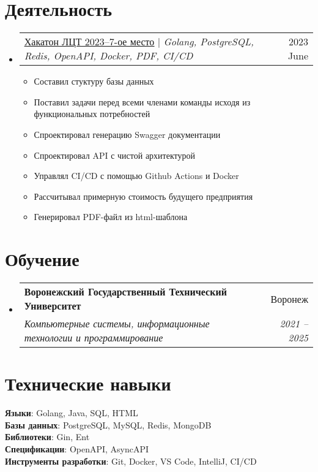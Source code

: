 \documentclass[letterpaper,11pt]{article}
\makeatletter
\newcommand{\resumeItem}[1]{
  \item\small{
    {#1 \vspace{-2pt}}
  }
}
\newcommand{\resumeSubheading}[4]{
  \vspace{-2pt}\item
    \begin{tabular*}{0.97\textwidth}[t]{l@{\extracolsep{\fill}}r}
      \textbf{#1} & #2 \\
      \textit{\small#3} & \textit{\small #4} \\
    \end{tabular*}\vspace{-7pt}
}
\newcommand{\resumeProjectHeading}[2]{
    \item
    \begin{tabular*}{0.97\textwidth}{l@{\extracolsep{\fill}}r}
      \small#1 & #2 \\
    \end{tabular*}\vspace{-7pt}
}
\newcommand{\resumeSubHeadingListStart}{\begin{itemize}[leftmargin=0.15in, label={}]}
\newcommand{\resumeSubHeadingListEnd}{\end{itemize}}
\newcommand{\resumeItemListStart}{\begin{itemize}}
\newcommand{\resumeItemListEnd}{\end{itemize}\vspace{-5pt}}
\makeatother
\begin{document}
\section{Деятельность}
\resumeSubHeadingListStart
\resumeProjectHeading
{\href{https://github.com/wtkeqrf0/CV/blob/main/Leaders_Digital_Transformations_2023.pdf}{\underline{Хакатон ЛЦТ 2023--7-ое место}} $|$ \emph{Golang, PostgreSQL, Redis, OpenAPI, Docker, PDF, CI/CD}}{2023 June}
\resumeItemListStart
\resumeItem{Составил стуктуру базы данных}
\resumeItem{Поставил задачи перед всеми членами команды исходя из функциональных потребностей}
\resumeItem{Спроектировал генерацию Swagger документации}
\resumeItem{Спроектировал API с чистой архитектурой}
\resumeItem{Управлял CI/CD с помощью Github Actions и Docker}
\resumeItem{Рассчитывал примерную стоимость будущего предприятия}
\resumeItem{Генерировал PDF-файл из html-шаблона}
\resumeItemListEnd
\resumeSubHeadingListEnd

\section{Обучение}
\resumeSubHeadingListStart
\resumeSubheading
{Воронежский Государственный Технический Университет}{Воронеж}
{Компьютерные системы, информационные технологии и программирование}{2021 -- 2025}
\resumeSubHeadingListEnd

\section{Технические навыки}
\begin{itemize}[leftmargin=0.15in, label={}]
	\small{\item{
		\textbf{Языки}{: Golang, Java, SQL, HTML} \\
		\textbf{Базы данных}{: PostgreSQL, MySQL, Redis, MongoDB} \\
		\textbf{Библиотеки}{: Gin, Ent} \\
		\textbf{Спецификации}{: OpenAPI, AsyncAPI} \\
		\textbf{Инструменты разработки}{: Git, Docker, VS Code, IntelliJ, CI/CD} \\
	}}
\end{itemize}

\end{document}
